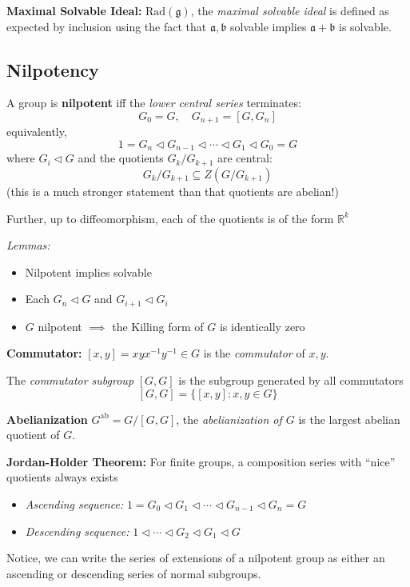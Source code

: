 \documentclass[12pt]{article}
\newcommand{\R}{\mathbb{R}}
\newcommand{\g}{\mathfrak{g}}
\begin{document}
\textbf{Maximal Solvable Ideal:} $\text{Rad}(\g)$, the \emph{maximal solvable ideal} is defined as expected by inclusion using the fact that $\mathfrak{a}, \mathfrak{b}$ solvable implies $\mathfrak{a} + \mathfrak{b}$ is solvable.

\subsection*{Nilpotency}
A group is \textbf{nilpotent} iff the \emph{lower central series} terminates:
\[G_0 = G, \quad G_{n+1} = [G, G_n]\]
equivalently, 
\[1 = G_n \triangleleft G_{n-1} \triangleleft \cdots \triangleleft G_1 \triangleleft G_0 = G\]
where $G_i \triangleleft G$ and the quotients $G_k/G_{k+1}$ are central:
\[G_k/G_{k+1} \subseteq Z(G/G_{k+1})\]
(this is a much stronger statement than that quotients are abelian!)

Further, up to diffeomorphism, each of the quotients is of the form $\R^k$

\emph{Lemmas:}
\begin{itemize}
    \item Nilpotent implies solvable 
    \item Each $G_n \triangleleft G$ and $G_{i+1} \triangleleft G_i$
    \item $G$ nilpotent $\implies$ the Killing form of $G$ is identically zero  
\end{itemize}

\textbf{Commutator:} $[x, y] = xyx^{-1}y^{-1} \in G$ is the \emph{commutator} of $x, y$.

The \emph{commutator subgroup} $[G, G]$ is the subgroup generated by all commutators 
\[[G, G] = \{[x, y]: x, y \in G\}\]

\textbf{Abelianization} $G^{\text{ab}} = G/[G, G]$, the \emph{abelianization of $G$} is the largest abelian quotient of $G$.

\textbf{Jordan-Holder Theorem:} For finite groups, a composition series with ``nice'' quotients always exists 
\begin{itemize}
    \item \emph{Ascending sequence:} $1 = G_0 \triangleleft G_1 \triangleleft \cdots \triangleleft G_{n-1} \triangleleft G_n = G$
    \item \emph{Descending sequence:} $1 \triangleleft \cdots \triangleleft G_{2} \triangleleft G_1 \triangleleft G$
\end{itemize}

Notice, we can write the series of extensions of a nilpotent group as either an ascending or descending series of normal subgroups. 
\end{document}
